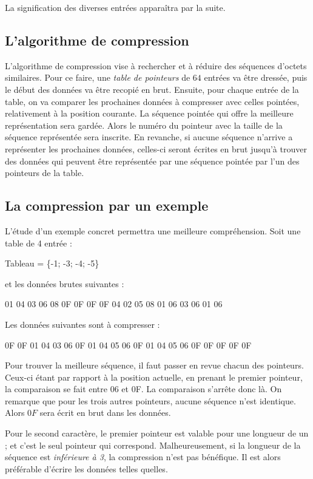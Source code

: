 La signification des diverses entrées apparaîtra par la suite.

\subsection{L'algorithme de compression}
L'algorithme de compression vise à rechercher et à réduire des séquences
d'octets similaires. Pour ce faire, une \emph{table de pointeurs} de $64$
entrées va être dressée, puis le début des données va être recopié
en brut. Ensuite, pour chaque entrée de la table, on va comparer les
prochaines données à compresser avec celles pointées, relativement à la
position courante. La séquence pointée qui offre la meilleure
représentation sera gardée. Alors le numéro du pointeur avec la taille de
la séquence représentée sera inscrite. En revanche, si aucune séquence
n'arrive a représenter les prochaines données, celles-ci seront écrites
en brut jusqu'à trouver des données qui peuvent être représentée par une
séquence pointée par l'un des pointeurs de la table.

\subsection{La compression par un exemple}
L'étude d'un exemple concret permettra une meilleure compréhension. Soit une
table de 4 entrée :
\begin{exemple}
Tableau = \{-1; -3; -4; -5\}
\end{exemple}

et les données brutes suivantes :
\begin{exemple}
01 04 03 06 08 0F 0F 0F 0F 04 02 05 08 01 06 03 06 01 06
\end{exemple}

Les données suivantes sont à compresser :
\begin{exemple}
0F 0F 01 04 03 06 0F 01 04 05 06 0F 01 04 05 06 0F 0F 0F 0F 0F
\end{exemple}

Pour trouver la meilleure séquence, il faut passer en revue chacun des
pointeurs. Ceux-ci étant par rapport à la position actuelle, en prenant
le premier pointeur, la comparaison se fait entre 06 et 0F. La comparaison
s'arrête donc là. On remarque que pour les trois autres pointeurs, aucune
séquence n'est identique. Alors $0F$ sera écrit en brut dans les données.

Pour le second caractère, le premier pointeur est valable pour une longueur
de un ; et c'est le seul pointeur qui correspond. Malheureusement, si la
longueur de la séquence est \emph{inférieure à 3}, la compression n'est pas
bénéfique. Il est alors préférable d'écrire les données telles quelles.

